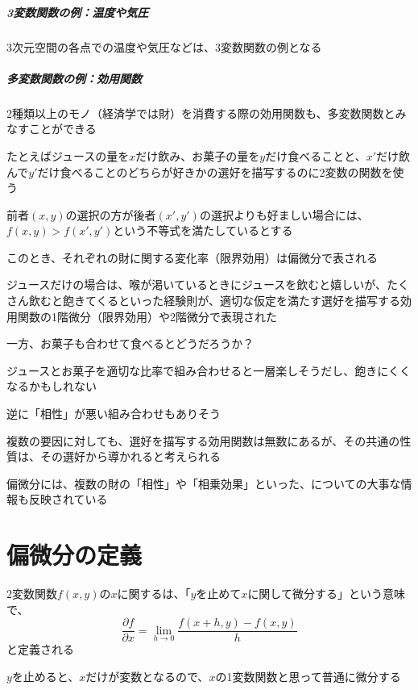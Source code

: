 \documentclass[../book_jiriki_calc]{subfiles}
\begin{document}
\subparagraph{3変数関数の例：温度や気圧}\quad

3次元空間の各点での温度や気圧などは、3変数関数の例となる

\br

\subparagraph{多変数関数の例：効用関数}\quad

2種類以上のモノ（経済学では財）を消費する際の効用関数も、多変数関数とみなすことができる

\br

たとえばジュースの量を$x$だけ飲み、お菓子の量を$y$だけ食べることと、$x'$だけ飲んで$y'$だけ食べることのどちらが好きかの選好を描写するのに2変数の関数を使う

前者$(x, y)$の選択の方が後者$(x', y')$の選択よりも好ましい場合には、$f(x, y) > f(x', y')$という不等式を満たしているとする

このとき、それぞれの財に関する変化率（限界効用）は偏微分で表される

\br

ジュースだけの場合は、喉が渇いているときにジュースを飲むと嬉しいが、たくさん飲むと飽きてくるといった経験則が、適切な仮定を満たす選好を描写する効用関数の1階微分（限界効用）や2階微分で表現された

一方、お菓子も合わせて食べるとどうだろうか？

ジュースとお菓子を適切な比率で組み合わせると一層楽しそうだし、飽きにくくなるかもしれない

逆に「相性」が悪い組み合わせもありそう

\br

複数の要因に対しても、選好を描写する効用関数は無数にあるが、その共通の性質は、その選好から導かれると考えられる

偏微分には、複数の財の「相性」や「相乗効果」といった、についての大事な情報も反映されている

\section{偏微分の定義}

2変数関数$f(x, y)$の$x$に関するは、「$y$を止めて$x$に関して微分する」という意味で、
\begin{equation*}
  \frac{\partial f}{\partial x} = \lim_{h \to 0} \frac{f(x + h, y) - f(x, y)}{h}
\end{equation*}
と定義される

$y$を止めると、$x$だけが変数となるので、$x$の1変数関数と思って普通に微分する

\br
\end{document}
